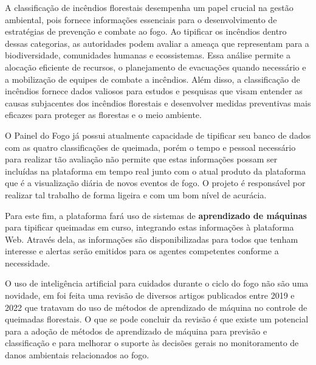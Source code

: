 
A classificação de incêndios florestais desempenha um papel crucial na gestão ambiental, pois fornece informações essenciais para o desenvolvimento de estratégias de prevenção e combate ao fogo. Ao tipificar os incêndios dentro dessas categorias, as autoridades podem avaliar a ameaça que representam para a biodiversidade, comunidades humanas e ecossistemas. Essa análise permite a alocação eficiente de recursos, o planejamento de evacuações quando necessário e a mobilização de equipes de combate a incêndios. Além disso, a classificação de incêndios fornece dados valiosos para estudos e pesquisas que visam entender as causas subjacentes dos incêndios florestais e desenvolver medidas preventivas mais eficazes para proteger as florestas e o meio ambiente.

O Painel do Fogo já possui atualmente capacidade de tipificar seu banco de dados com as quatro classificações de queimada, porém o tempo e pessoal necessário para realizar tão avaliação não permite que estas informações possam ser incluídas na plataforma em tempo real junto com o atual produto da plataforma que é a visualização diária de novos eventos de fogo. O projeto é responsável por realizar tal trabalho de forma ligeira e com um bom nível de acurácia.

Para este fim, a plataforma fará uso de sistemas de \textbf{aprendizado de máquinas} para tipificar queimadas em curso, integrando estas informações à plataforma Web. Através dela, as informações são disponibilizadas para todos que tenham interesse e alertas serão emitidos para os agentes competentes conforme a necessidade.

O uso de inteligência artificial para cuidados durante o ciclo do fogo não são uma novidade, em \cite{invention} foi feita uma revisão de diversos artigos publicados entre 2019 e 2022 que tratavam do uso de métodos de aprendizado de máquina no controle de queimadas florestais. O que se pode concluir da revisão é que existe um potencial para a adoção de métodos de aprendizado de máquina para previsão e classificação e para melhorar o suporte às decisões gerais no monitoramento de danos ambientais relacionados ao fogo.

